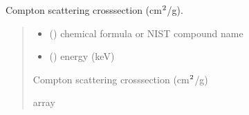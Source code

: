\documentclass[letterpaper,10pt,english,openany,oneside]{sphinxmanual}
\begin{document}
\begin{fulllineitems}
\label{\detokenize{api/cross_sections:dxraylib.CS_Compt_CP}}
\pysigstartsignatures
{}
\pysigstopsignatures
\sphinxAtStartPar
Compton scattering cross\sphinxhyphen{}section (cm\(\sp{\text{2}}\)/g).
\begin{quote}\begin{description}
\begin{itemize}
\item {} 
\sphinxAtStartPar
{} () \textendash{} chemical formula or NIST compound name

\item {} 
\sphinxAtStartPar
{} () \textendash{} energy (keV)

\end{itemize}

\sphinxAtStartPar
Compton scattering cross\sphinxhyphen{}section (cm\(\sp{\text{2}}\)/g)

\sphinxAtStartPar
array

\end{description}\end{quote}

\end{fulllineitems}


\begin{DUlineblock}{0em}
\item[] 
\end{DUlineblock}
\end{document}
